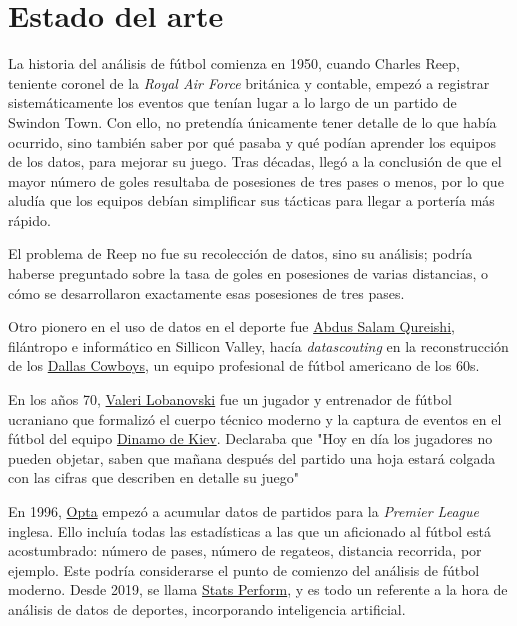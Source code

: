 \chapter{Estado del arte}
La historia del análisis de fútbol comienza en 1950, cuando Charles Reep\cite{reep-bio}, teniente coronel de 
la \textit{Royal Air Force} británica y contable, empezó a 
registrar sistemáticamente los eventos que tenían lugar a lo largo de un partido de Swindon Town. Con ello, no pretendía 
únicamente tener detalle de lo que había ocurrido, sino también saber por qué pasaba y qué podían aprender los 
equipos de los datos, para mejorar su juego. Tras décadas, llegó a la conclusión de que el mayor número 
de goles resultaba de posesiones de tres pases o menos, por lo que aludía que los equipos debían simplificar 
sus tácticas para llegar a portería más rápido.

El problema de Reep no fue su recolección de datos, sino su análisis; podría haberse preguntado sobre 
la tasa de goles en posesiones de varias distancias, o cómo se desarrollaron exactamente esas 
posesiones de tres pases. 

Otro pionero en el uso de datos en el deporte fue \href{http://www.riazhaq.com/2022/08/remembering-salam-qureishi-pillar-of.html}{Abdus Salam Qureishi}, 
filántropo e informático en Sillicon Valley, hacía \textit{datascouting} en la reconstrucción de los 
\href{https://www.dallascowboys.com/}{Dallas Cowboys}, un equipo profesional de fútbol americano de los 60s.\cite{chazan2020sports}

En los años 70, \href{https://es.wikipedia.org/wiki/Valeri_Lobanovski}{Valeri Lobanovski} fue un jugador y entrenador de 
fútbol ucraniano que formalizó el cuerpo técnico moderno y la captura de eventos en el fútbol del equipo \href{https://es.wikipedia.org/wiki/F._C._Dinamo_de_Kiev}{Dinamo de 
Kiev}. Declaraba que "Hoy en día los jugadores no pueden objetar, saben que mañana después del partido una hoja estará colgada con 
las cifras que describen en detalle su juego"\cite{kilpatrick2011inverting}

En 1996, \href{https://es.wikipedia.org/wiki/Opta_Sports}{Opta} empezó a acumular datos de partidos para la 
\textit{Premier League} inglesa. Ello incluía todas las estadísticas a las que un aficionado al fútbol está 
acostumbrado: número de pases, número de regateos, distancia recorrida, por ejemplo. Este podría considerarse 
el punto de comienzo del análisis de fútbol moderno. Desde 2019, se llama \href{https://www.statsperform.com/}{Stats Perform}, y 
es todo un referente a la hora de análisis de datos de deportes, incorporando inteligencia artificial.


